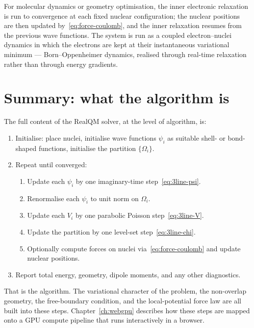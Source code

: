 For molecular dynamics or geometry optimisation, the inner electronic relaxation is run to convergence at each fixed nuclear configuration; the nuclear positions are then updated by~\eqref{eq:force-coulomb}, and the inner relaxation resumes from the previous wave functions. The system is run as a coupled electron--nuclei dynamics in which the electrons are kept at their instantaneous variational minimum --- Born--Oppenheimer dynamics, realised through real-time relaxation rather than through energy gradients.

\section{Summary: what the algorithm is}\label{sec:algo-summary}

The full content of the RealQM solver, at the level of algorithm, is:

\begin{enumerate}
\item Initialise: place nuclei, initialise wave functions $\psi_i$ as suitable shell- or bond-shaped functions, initialise the partition $\{\Omega_i\}$.
\item Repeat until converged:
  \begin{enumerate}
  \item Update each $\psi_i$ by one imaginary-time step~\eqref{eq:3line-psi}.
  \item Renormalise each $\psi_i$ to unit norm on $\Omega_i$.
  \item Update each $V_i$ by one parabolic Poisson step~\eqref{eq:3line-V}.
  \item Update the partition by one level-set step~\eqref{eq:3line-chi}.
  \item Optionally compute forces on nuclei via~\eqref{eq:force-coulomb} and update nuclear positions.
  \end{enumerate}
\item Report total energy, geometry, dipole moments, and any other diagnostics.
\end{enumerate}

That is the algorithm. The variational character of the problem, the non-overlap geometry, the free-boundary condition, and the local-potential force law are all built into these steps. Chapter~\ref{ch:webgpu} describes how these steps are mapped onto a GPU compute pipeline that runs interactively in a browser.

